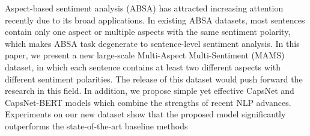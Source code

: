 Aspect-based sentiment analysis (ABSA) has attracted increasing attention recently due to its broad applications. In existing ABSA datasets, most sentences contain only one aspect or multiple aspects with the same sentiment polarity, which makes ABSA task degenerate to sentence-level sentiment analysis. In this paper, we present a new large-scale Multi-Aspect Multi-Sentiment (MAMS) dataset, in which each sentence contains at least two different aspects with different sentiment polarities. The release of this dataset would push forward the research in this field. In addition, we propose simple yet effective CapsNet and CapsNet-BERT models which combine the strengths of recent NLP advances. Experiments on our new dataset show that  the proposed model significantly outperforms the state-of-the-art baseline methods